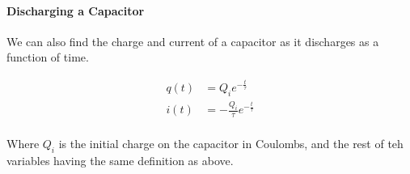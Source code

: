 \paragraph*{Discharging a Capacitor}
We can also find the charge and current of a capacitor as it discharges as a function of time.

\begin{align*}
    q(t) &= Q_ie^{-\frac{t}{\tau}}\\
    i(t) &= -\frac{Q_i}{\tau}e^{-\frac{t}{\tau}}\\
\end{align*}

Where $Q_i$ is the initial charge on the capacitor in Coulombs, and the rest of teh variables having the same definition as above.